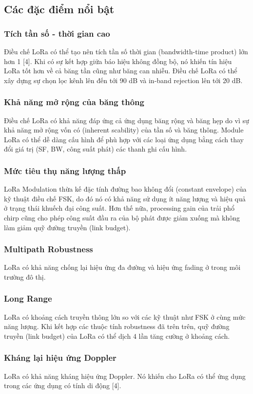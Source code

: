 \subsection{Các đặc điểm nổi bật}

\subsubsection{	Tích tần số - thời gian cao}
Điều chế LoRa có thể tạo nên tích tần số thời gian (bandwidth-time product) lớn hơn 1 [4]. Khi có sự kết hợp giữa báo hiệu không đồng bộ, nó khiến tín hiệu LoRa tốt hơn về cả băng tần cũng như băng can nhiễu. Điều chế LoRa có thể xây dựng sự chọn lọc kênh lên đến tới 90 dB và in-band rejection lên tới 20 dB.
\subsubsection{	Khả năng mở rộng của băng thông}
Điều chế LoRa có khả năng đáp ứng cả ứng dụng băng rộng và băng hẹp do vì sự khả năng mở rộng vốn có (inherent scability) của tần số và băng thông. Module LoRa có thể dễ dàng cấu hình để phù hợp với các loại ứng dụng bằng cách thay đổi giá trị (SF, BW, công suất phát) các thanh ghi cấu hình.
\subsubsection{	Mức tiêu thụ năng lượng thấp}
LoRa Modulation thừa kế đặc tính đường bao không đổi (constant envelope) của kỹ thuật điều chế FSK, do đó nó có khả năng sử dụng ít năng lượng và hiệu quả ở trạng thái khuếch đại công suất. Hơn thế nữa, processing gain của trải phổ chirp cũng cho phép công suất đầu ra của bộ phát được giảm xuống mà không làm giảm quỹ đường truyền (link budget).
\subsubsection{	Multipath Robustness}
LoRa có khả năng chống lại hiệu ứng đa đường và hiệu ứng fading ở trong môi trường đô thị.
\subsubsection{	Long Range}
LoRa có khoảng cách truyền thông lớn so với các kỹ thuật như FSK ở cùng mức năng lượng. Khi kết hợp các thuộc tính robustness đã trên trên, quỹ đường truyền (link budget) của LoRa có thể dịch 4 lần tăng cường ở khoảng cách.
\subsubsection{	Kháng lại hiệu ứng Doppler}
LoRa có khả năng kháng hiệu ứng Doppler. Nó khiến cho LoRa có thể ứng dụng trong các ứng dụng có tính di động [4].
